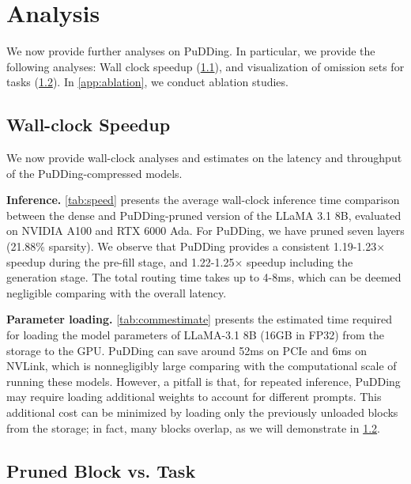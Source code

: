 \section{Analysis}
We now provide further analyses on PuDDing. In particular, we provide the following analyses: Wall clock speedup (\cref{ssec:speedup}), and visualization of omission sets for tasks (\cref{ssec:blockanalysis}). In \cref{app:ablation}, we conduct ablation studies.









\subsection{Wall-clock Speedup}\label{ssec:speedup}

We now provide wall-clock analyses and estimates on the latency and throughput of the PuDDing-compressed models.



\textbf{Inference.} \cref{tab:speed} presents the average wall-clock inference time comparison between the dense and PuDDing-pruned version of the LLaMA 3.1 8B, evaluated on NVIDIA A100 and RTX 6000 Ada. For PuDDing, we have pruned seven layers (21.88\% sparsity). We observe that PuDDing provides a consistent 1.19-1.23$\times$ speedup during the pre-fill stage, and 1.22-1.25$\times$ speedup including the generation stage. The total routing time takes up to 4-8ms, which can be deemed negligible comparing with the overall latency.



\textbf{Parameter loading.} \cref{tab:commestimate} presents the estimated time required for loading the model parameters of LLaMA-3.1 8B (16GB in FP32) from the storage to the GPU. PuDDing can save around 52ms on PCIe and 6ms on NVLink, which is nonnegligibly large comparing with the computational scale of running these models. However, a pitfall is that, for repeated inference, PuDDing may require loading additional weights to account for different prompts. This additional cost can be minimized by loading only the previously unloaded blocks from the storage; in fact, many blocks overlap, as we will demonstrate in \cref{ssec:blockanalysis}.


\subsection{Pruned Block vs. Task}\label{ssec:blockanalysis}

